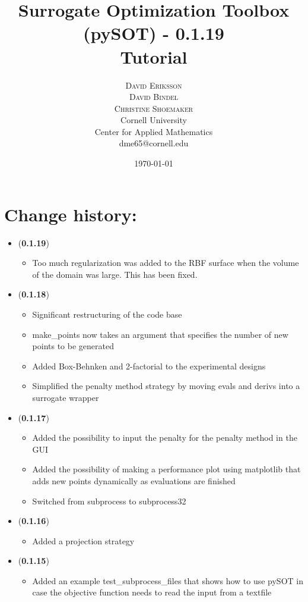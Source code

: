 \documentclass[]{article}
\title{\vspace{-15mm}%
	\fontsize{18pt}{10pt}\selectfont
	\textbf{Surrogate Optimization Toolbox (pySOT) - 0.1.19 \\ Tutorial}
	}
\author{%
	\Large\textsc{David Eriksson} \\[2mm]
	\Large\textsc{David Bindel} \\[2mm]
	\Large\textsc{Christine Shoemaker} \\[2mm]
		\normalsize	Cornell University \\
	\normalsize Center for Applied Mathematics \\
	\normalsize	dme65@cornell.edu \\ 
	}
\date{\today}
\begin{document}
\fontsize{12}{14}\rm

\maketitle
\thispagestyle{fancy}
\tableofcontents
\newpage

\section{Change history:}
\begin{itemize}

\item (\textbf{0.1.19})
\begin{itemize}
\item 	Too much regularization was added to the RBF surface when the volume of the domain was large. This has been fixed.
\end{itemize}

\item (\textbf{0.1.18})
\begin{itemize}
\item Significant restructuring of the code base
\item make\_points now takes an argument that specifies the number of new points to be generated
\item Added Box-Behnken and 2-factorial to the experimental designs
\item Simplified the penalty method strategy by moving evals and derivs into a surrogate wrapper
\end{itemize}

\item (\textbf{0.1.17})
\begin{itemize}
\item Added the possibility to input the penalty for the penalty method in the GUI
\item Added the possibility of making a performance plot using matplotlib that adds new points dynamically as evaluations are finished
\item Switched from subprocess to subprocess32
\end{itemize}

\item (\textbf{0.1.16})
\begin{itemize}
\item Added a projection strategy
\end{itemize}

\item (\textbf{0.1.15})
\begin{itemize}
\item Added an example test\_subprocess\_files that shows how to use pySOT in case the objective function needs to read the input from a textfile
\end{itemize}


\end{itemize}
\end{document}
